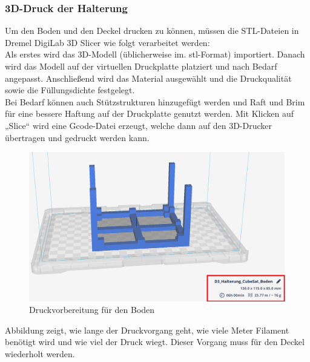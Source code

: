 \subsubsection{3D-Druck der Halterung}
Um den Boden und den Deckel drucken zu können, müssen die STL-Dateien in Dremel DigiLab 3D Slicer wie folgt verarbeitet werden:\\
\vspace{3mm}
Als erstes wird das 3D-Modell (üblicherweise im. stl-Format) importiert. Danach wird das Modell auf der virtuellen Druckplatte platziert und nach Bedarf angepasst. Anschließend wird das Material ausgewählt und die Druckqualität sowie die Füllungsdichte festgelegt. \\
\vspace{3mm}
Bei Bedarf können auch Stützstrukturen hinzugefügt werden und Raft und Brim für eine bessere Haftung auf der Druckplatte genutzt werden. Mit Klicken auf „Slice“ wird eine Gcode-Datei erzeugt, welche dann auf den 3D-Drucker übertragen und gedruckt werden kann.
\vspace{3mm}
\begin{figure}[H]
    \centering
    \includegraphics[scale=0.7]{image/druckvorbereitungboden.png}
    \caption{Druckvorbereitung für den Boden}
    \label{fig:enter-label}
\end{figure}
\vspace{3mm}
Abbildung zeigt, wie lange der Druckvorgang geht, wie viele Meter Filament benötigt wird und wie viel der Druck wiegt. Dieser Vorgang muss für den Deckel wiederholt werden.\\
\vspace{3mm}
